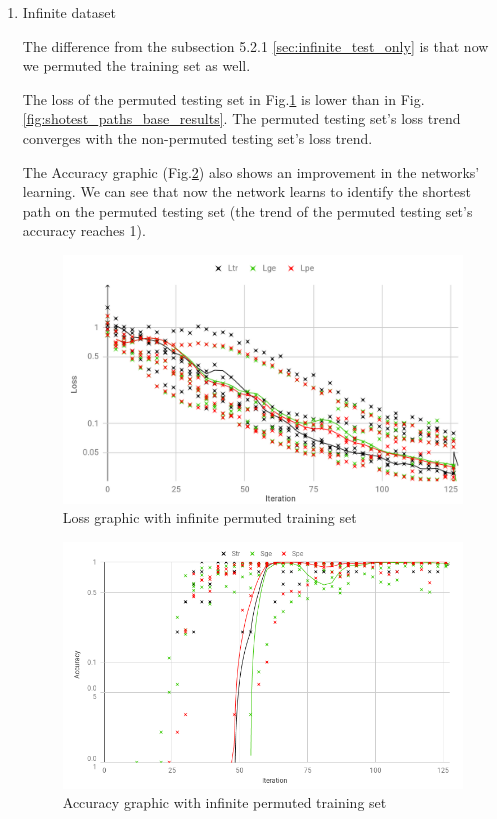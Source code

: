 \begin{enumerate}[label=(\Alph*)]

        \item Infinite dataset
        
        The difference from the subsection 5.2.1 \ref{sec:infinite_test_only} is that now we permuted the training set as well.
        
        The loss of the permuted testing set in Fig.\ref{fig:shotest_paths_train_perm_results} is lower than in Fig.\ref{fig:shotest_paths_base_results}. The permuted testing set's loss trend converges with the non-permuted testing set's loss trend.
        
        The Accuracy graphic (Fig.\ref{fig:shotest_paths_train_perm_ACC_results}) also shows an improvement in the networks' learning. We can see that now the network learns to identify the shortest path on the permuted testing set (the trend of the permuted testing set's accuracy reaches 1).
        
        \begin{figure}[H]
            \centering
            \includegraphics[width=.9\linewidth]{fig/content/results/shortest_path/training_perm.png}
            \caption{Loss graphic with infinite permuted training set}
            \label{fig:shotest_paths_train_perm_results}
        \end{figure}
        
        \begin{figure}[H]
            \centering
            \includegraphics[width=.9\linewidth]{fig/content/results/shortest_path/training_perm_ACC.png}
            \caption{Accuracy graphic with infinite permuted training set}
            \label{fig:shotest_paths_train_perm_ACC_results}
        \end{figure}
        

\end{enumerate}
